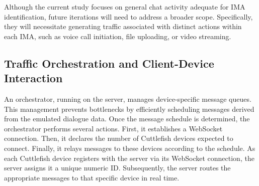 \documentclass[conference]{IEEEtran}
\begin{document}
Although the current study focuses on general chat activity adequate for IMA identification, future iterations will need to address a broader scope. Specifically, they will necessitate generating traffic associated with distinct actions within each IMA, such as voice call initiation, file uploading, or video streaming.

\begin{table}[!ht]
\centering
\caption{dialogue schedule snippet}
\label{tab:Top5TrimmedDialogue}
\end{table}

\subsection{Traffic Orchestration and Client-Device Interaction}
An orchestrator, running on the server, manages device-specific message queues. This management prevents bottlenecks by efficiently scheduling messages derived from the emulated dialogue data. Once the message schedule is determined, the orchestrator performs several actions. First, it establishes a WebSocket connection. Then, it declares the number of Cuttlefish devices expected to connect. Finally, it relays messages to these devices according to the schedule. As each Cuttlefish device registers with the server via its WebSocket connection, the server assigns it a unique numeric ID. Subsequently, the server routes the appropriate messages to that specific device in real time.
\end{document}
